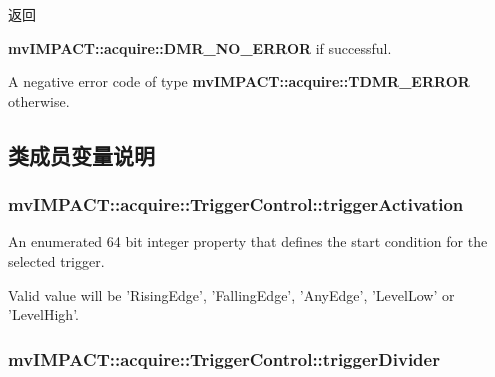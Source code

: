 \begin{DoxyReturn}{返回}

\begin{DoxyItemize}
\item {\bfseries mv\+I\+M\+P\+A\+C\+T\+::acquire\+::\+D\+M\+R\+\_\+\+N\+O\+\_\+\+E\+R\+R\+O\+R} if successful.
\item A negative error code of type {\bfseries mv\+I\+M\+P\+A\+C\+T\+::acquire\+::\+T\+D\+M\+R\+\_\+\+E\+R\+R\+O\+R} otherwise. 
\end{DoxyItemize}
\end{DoxyReturn}


\subsection{类成员变量说明}
\hypertarget{classmv_i_m_p_a_c_t_1_1acquire_1_1_trigger_control_a285ca671cde7d936027f19781070e0cc}{
\subsubsection[{trigger\+Activation}]{ mv\+I\+M\+P\+A\+C\+T\+::acquire\+::\+Trigger\+Control\+::trigger\+Activation}}\label{classmv_i_m_p_a_c_t_1_1acquire_1_1_trigger_control_a285ca671cde7d936027f19781070e0cc}


An enumerated 64 bit integer property that defines the start condition for the selected trigger. 

Valid value will be 'Rising\+Edge', 'Falling\+Edge', 'Any\+Edge', 'Level\+Low' or 'Level\+High'. \hypertarget{classmv_i_m_p_a_c_t_1_1acquire_1_1_trigger_control_a53b2713eee5c3a895e772f8a2cfb0cbf}{
\subsubsection[{trigger\+Divider}]{ mv\+I\+M\+P\+A\+C\+T\+::acquire\+::\+Trigger\+Control\+::trigger\+Divider}}\label{classmv_i_m_p_a_c_t_1_1acquire_1_1_trigger_control_a53b2713eee5c3a895e772f8a2cfb0cbf}


